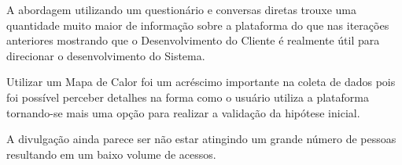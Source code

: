 \par A abordagem utilizando um questionário e conversas diretas trouxe uma quantidade muito maior de informação sobre a plataforma do que nas iterações anteriores mostrando que o Desenvolvimento do Cliente é realmente útil para direcionar o desenvolvimento do Sistema.
\par Utilizar um Mapa de Calor foi um acréscimo importante na coleta de dados pois foi possível perceber detalhes na forma como o usuário utiliza a plataforma tornando-se mais uma opção para realizar a validação da hipótese inicial.
\par A divulgação ainda parece ser não estar atingindo um grande número de pessoas resultando em um baixo volume de acessos.
